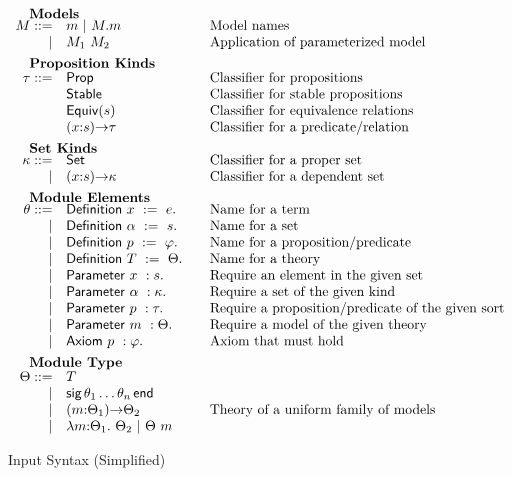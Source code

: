 \begin{figure}
\[\begin{array}{rl@{\qquad}l}
		\noalign{\textbf{Models}}		
		\im ::= 
		    & \iM  \ibar \iselect{\im}{\iM}&\mbox{Model names}\\
		  | & \iapp{\im_1}{\im_2}&\mbox{Application of parameterized model}\\[5pt]
		
		\noalign{\textbf{Proposition Kinds}}
		\ipt ::=
		    & \iProp & \mbox{Classifier for propositions}\\
		    & \iStable & \mbox{Classifier for stable propositions}\\
		    & \iEquiv{\is} &\mbox{Classifier for equivalence relations}\\
		    & \idarrow{\ix}{\is}{\ipt} & \mbox{Classifier for a predicate/relation}\\[5pt] 
		
		\noalign{\textbf{Set Kinds}}
		\ik ::= 
		    & \iSet &\mbox{Classifier for a proper set}\\
		   | & \idarrow{\ix}{\is}{\ik} &\mbox{Classifier for a dependent set}\\[5pt]
		

		\noalign{\textbf{Module Elements}}
		\ite ::=
		     & \iDefinition{\ix}{\ie}&\mbox{Name for a term}\\
		   | & \iDefinition{\iS}{\is}&\mbox{Name for a set}\\
		   | & \iDefinition{\iP}{\ip}&\mbox{Name for a proposition/predicate}\\
		   | & \iDefinition{\iTH}{\ith}&\mbox{Name for a theory}\\
		   | & \iParameter{\ix}{\is}&\mbox{Require an element in the given set}\\
		   | & \iParameter{\iS}{\ik}&\mbox{Require a set of the given kind}\\
		   | & \iParameter{\iP}{\ipt}&\mbox{Require a proposition/predicate of the given sort}\\
		   | & \iParameter{\iM}{\ith}&\mbox{Require a model of the given theory}\\
		   | & \iAxiom{\iP}{\ip}&\mbox{Axiom that must hold}\\[5pt]

  		\noalign{\textbf{Module Type}}
		\ith ::= 
		     & \iTH\\
		   	| & \isig{\ite_1 \ldots \ite_n}\\
		 	| & \idarrow{\iM}{\ith_1}{\ith_2} &\mbox{Theory of a uniform family of models}\\
		  	| & \ilambda{\iM}{\ith_1}{\ith_2} \ibar \iapp{\ith}{\iM}\\
	\end{array}
	\]
	\label{fig:input}
	\caption{Input Syntax (Simplified)}
\end{figure}





